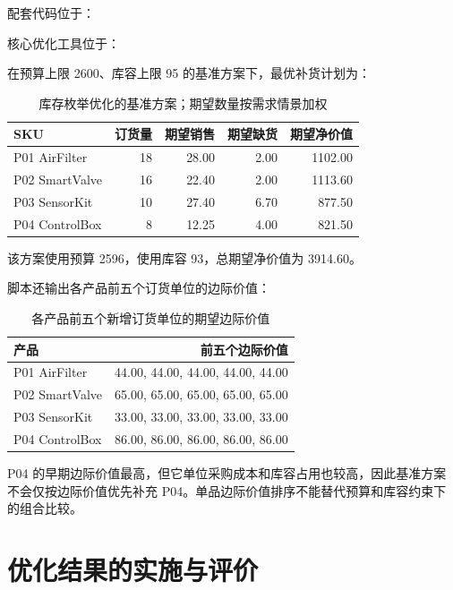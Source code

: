 配套代码位于：
\begin{center}
\end{center}
核心优化工具位于：
\begin{center}
\end{center}

在预算上限 2600、库容上限 95 的基准方案下，最优补货计划为：
\begin{table}[htbp]
\centering
\caption{库存枚举优化的基准方案；期望数量按需求情景加权}
\begin{tabular}{lrrrr}
\toprule
\rowcolor{BDMTableHead}
SKU & 订货量 & 期望销售 & 期望缺货 & 期望净价值\\
\midrule
P01 AirFilter & 18 & 28.00 & 2.00 & 1102.00\\
P02 SmartValve & 16 & 22.40 & 2.00 & 1113.60\\
P03 SensorKit & 10 & 27.40 & 6.70 & 877.50\\
P04 ControlBox & 8 & 12.25 & 4.00 & 821.50\\
\bottomrule
\end{tabular}
\end{table}
该方案使用预算 2596，使用库容 93，总期望净价值为 3914.60。

脚本还输出各产品前五个订货单位的边际价值：
\begin{table}[htbp]
\centering
\caption{各产品前五个新增订货单位的期望边际价值}
\begin{tabular}{lr}
\toprule
\rowcolor{BDMTableHead}
产品 & 前五个边际价值\\
\midrule
P01 AirFilter & 44.00, 44.00, 44.00, 44.00, 44.00\\
P02 SmartValve & 65.00, 65.00, 65.00, 65.00, 65.00\\
P03 SensorKit & 33.00, 33.00, 33.00, 33.00, 33.00\\
P04 ControlBox & 86.00, 86.00, 86.00, 86.00, 86.00\\
\bottomrule
\end{tabular}
\end{table}
P04 的早期边际价值最高，但它单位采购成本和库容占用也较高，因此基准方案不会仅按边际价值优先补充 P04。单品边际价值排序不能替代预算和库容约束下的组合比较。

\section{优化结果的实施与评价}

